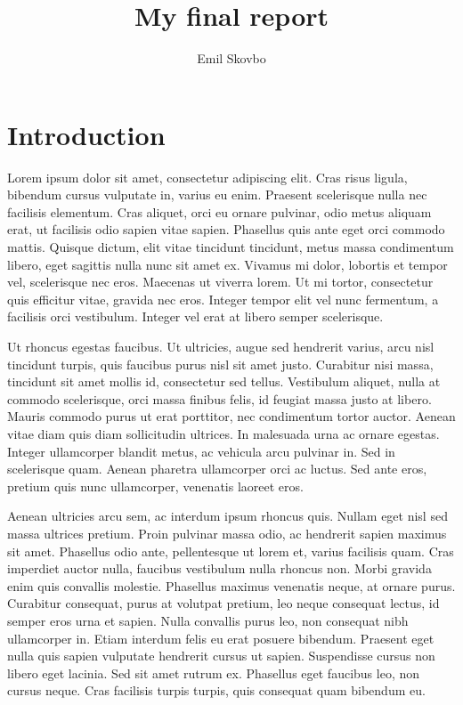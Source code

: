 \documentclass{article}
\title{My final report}
\author{Emil Skovbo}
\date{ }
\begin{document}
\clearpage
\maketitle
\thispagestyle{empty}

\tableofcontents
\section{Introduction}

Lorem ipsum dolor sit amet, consectetur adipiscing elit. Cras risus ligula, bibendum cursus vulputate in, varius eu enim. Praesent scelerisque nulla nec facilisis elementum. Cras aliquet, orci eu ornare pulvinar, odio metus aliquam erat, ut facilisis odio sapien vitae sapien. Phasellus quis ante eget orci commodo mattis. Quisque dictum, elit vitae tincidunt tincidunt, metus massa condimentum libero, eget sagittis nulla nunc sit amet ex. Vivamus mi dolor, lobortis et tempor vel, scelerisque nec eros. Maecenas ut viverra lorem. Ut mi tortor, consectetur quis efficitur vitae, gravida nec eros. Integer tempor elit vel nunc fermentum, a facilisis orci vestibulum. Integer vel erat at libero semper scelerisque.



Ut rhoncus egestas faucibus. Ut ultricies, augue sed hendrerit varius, arcu nisl tincidunt turpis, quis faucibus purus nisl sit amet justo. Curabitur nisi massa, tincidunt sit amet mollis id, consectetur sed tellus. Vestibulum aliquet, nulla at commodo scelerisque, orci massa finibus felis, id feugiat massa justo at libero. Mauris commodo purus ut erat porttitor, nec condimentum tortor auctor. Aenean vitae diam quis diam sollicitudin ultrices. In malesuada urna ac ornare egestas. Integer ullamcorper blandit metus, ac vehicula arcu pulvinar in. Sed in scelerisque quam. Aenean pharetra ullamcorper orci ac luctus. Sed ante eros, pretium quis nunc ullamcorper, venenatis laoreet eros.

Aenean ultricies arcu sem, ac interdum ipsum rhoncus quis. Nullam eget nisl sed massa ultrices pretium. Proin pulvinar massa odio, ac hendrerit sapien maximus sit amet. Phasellus odio ante, pellentesque ut lorem et, varius facilisis quam. Cras imperdiet auctor nulla, faucibus vestibulum nulla rhoncus non. Morbi gravida enim quis convallis molestie. Phasellus maximus venenatis neque, at ornare purus. Curabitur consequat, purus at volutpat pretium, leo neque consequat lectus, id semper eros urna et sapien. Nulla convallis purus leo, non consequat nibh ullamcorper in. Etiam interdum felis eu erat posuere bibendum. Praesent eget nulla quis sapien vulputate hendrerit cursus ut sapien. Suspendisse cursus non libero eget lacinia. Sed sit amet rutrum ex. Phasellus eget faucibus leo, non cursus neque. Cras facilisis turpis turpis, quis consequat quam bibendum eu.
\end{document}
